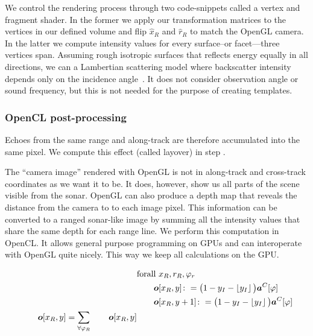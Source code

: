 We control the rendering process through two code-snippets called a vertex and fragment shader. In the former we apply our transformation matrices to the vertices in our defined volume and flip $\hat{x}_R$ and $\hat{r}_R$ to match the OpenGL camera. In the latter we compute intensity values for every surface--or facet---three vertices span. Assuming rough isotropic surfaces that reflects energy equally in all directions, we can a Lambertian scattering model where backscatter intensity depends only on the incidence angle~\cite{Zhang1999}. It does not consider observation angle or sound frequency, but this is not needed for the purpose of creating templates.


\subsubsection{OpenCL post-processing}

Echoes from the same range and along-track are therefore accumulated into the same pixel. We compute this effect (called layover) in step .

The ``camera image'' rendered with OpenGL is not in along-track and cross-track coordinates as we want it to be. It does, however, show us all parts of the scene visible from the sonar. OpenGL can also produce a depth map that reveals the distance from the camera to to each image pixel. This information can be converted to a ranged sonar-like image by summing all the intensity values that share the same depth for each range line. We perform this computation in OpenCL. It allows general purpose programming on GPUs and can interoperate with OpenGL quite nicely. This way we keep all calculations on the GPU.

\begin{align}
&\text{forall } x_R, r_R, \varphi_r \nonumber\\
&\qquad\boldsymbol{o}[x_R, y] \colon= \big(1 - y_I - \left\lfloor y_I\right\rfloor\big)\boldsymbol{a}^C[\varphi] \nonumber\\
&\qquad\boldsymbol{o}[x_R, y+1] \colon= \big(1 - y_I - \left\lfloor y_I\right\rfloor\big)\boldsymbol{a}^C[\varphi] \nonumber\\
\qquad\boldsymbol{o}[x_R, y] = \sum_{\forall \varphi_R} \qquad\boldsymbol{o}[x_R, y]
\end{align}

